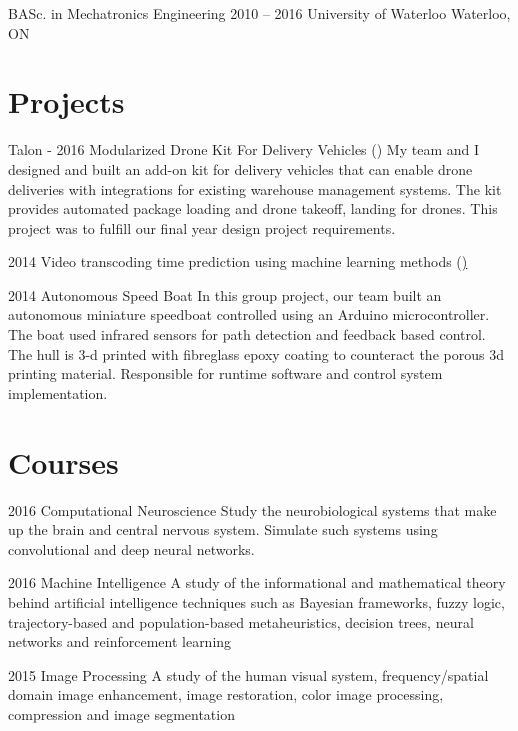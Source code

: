 \documentclass{tccv}
\begin{document}
\begin{yearlist}

\item[BASc. in Mechatronics Engineering]{2010 -- 2016}
     {University of Waterloo}
     {Waterloo, ON}

\end{yearlist}
\section{Projects}

\begin{yearlist}

    \item{Talon - 2016}
        {Modularized Drone Kit For Delivery Vehicles (\href{http://talonco.github.io}{})}
        {My team and I designed and built an add-on kit for delivery vehicles that can enable drone deliveries with integrations for existing warehouse management systems. The kit provides automated package loading and drone takeoff, landing for drones. This project was to fulfill our final year design project requirements.}
      \item{2014}
        {Video transcoding time prediction using machine learning methods (\href{http://github.com})}
        
     \item{2014}
         {Autonomous Speed Boat}
         {In this group project, our team built an autonomous miniature speedboat controlled using an Arduino microcontroller. The boat used infrared sensors for path detection and feedback based control. The hull is 3-d printed with fibreglass epoxy coating to counteract the porous 3d printing material. Responsible for runtime software and control system implementation.} 

\end{yearlist}

\section{Courses}

\begin{yearlist}

\item{2016}
     {Computational Neuroscience}
     {Study the neurobiological systems that make up the brain and central nervous system. Simulate such systems using convolutional and deep neural networks.}

\item{2016}
     {Machine Intelligence}
     {A study of the informational and mathematical theory behind  artificial intelligence techniques such as Bayesian frameworks, fuzzy logic, trajectory-based and population-based metaheuristics, decision trees, neural networks and reinforcement learning}

\item{2015}
     {Image Processing}
     {A study of the human visual system, frequency/spatial domain image enhancement, image restoration, color image processing, compression and image segmentation}



\end{yearlist}
\end{document}
